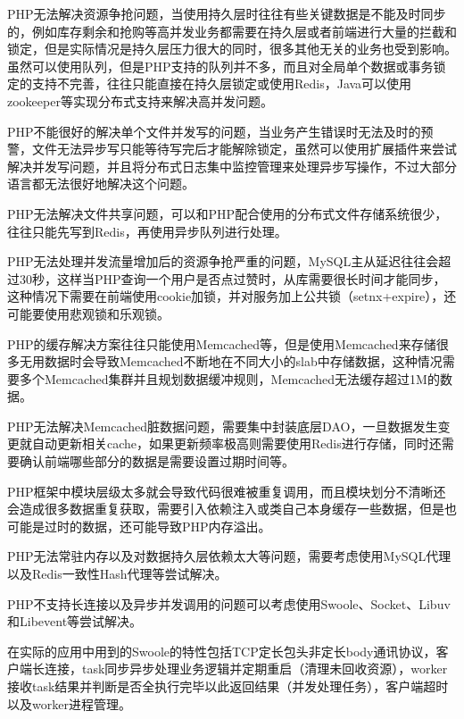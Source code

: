 PHP无法解决资源争抢问题，当使用持久层时往往有些关键数据是不能及时同步的，例如库存剩余和抢购等高并发业务都需要在持久层或者前端进行大量的拦截和锁定，但是实际情况是持久层压力很大的同时，很多其他无关的业务也受到影响。虽然可以使用队列，但是PHP支持的队列并不多，而且对全局单个数据或事务锁定的支持不完善，往往只能直接在持久层锁定或使用Redis，Java可以使用zookeeper等实现分布式支持来解决高并发问题。

PHP不能很好的解决单个文件并发写的问题​​，当业务产生错误时无法及时的预警，文件无法异步写只能等待写完后才能解除锁定，虽然可以使用扩展插件来尝试解决并发写问题，并且将分布式日志集中监控管理来处理异步写操作，不过大部分语言都无法很好地解决这个问题。

PHP无法解决文件共享问题，可以和PHP配合使用的分布式文件存储系统很少，往往只能先写到Redis，再使用异步队列进行处理。

PHP无法处理并发流量增加后的资源争抢严重的问题，MySQL主从延迟往往会超过30秒，这样当PHP查询一个用户是否点过赞时，从库需要很长时间才能同步，这种情况下需要在前端使用cookie加锁，并对服务加上公共锁（setnx+expire），还可能要使用悲观锁和乐观锁。

PHP的缓存解决方案往往只能使用Memcached等，但是使用Memcached来存储很多无用数据时会导致Memcached不断地在不同大小的slab中存储数据，这种情况需要多个Memcached集群并且规划数据缓冲规则，Memcached无法缓存超过1M的数据。

PHP无法解决Memcached脏数据问题，需要集中封装底层DAO，一旦数据发生变更就自动更新相关cache，如果更新频率极高则需要使用Redis进行存储，同时还需要​确认前端哪些部分的数据是需要设置过期时间等。


PHP框架中模块层级太多就会导致代码很难被重复调用，而且模块划分不清晰还会造成很多数据重复获取，需要引入依赖注入或类自己本身缓存一些数据，但是也可能是过时的数据，还可能导致PHP内存溢出。

PHP无法常驻内存以及对数据持久层依赖太大等问题，需要考虑使用MySQL代理以及Redis一致性Hash代理等尝试解决。

PHP不支持长连接以及异步并发调用的问题可以考虑使用Swoole、Socket、Libuv和Libevent等尝试解决。

在实际的应用中用到的Swoole的特性包括TCP定长包头非定长body通讯协议，客户端长连接，task同步异步处理业务逻辑并定期重启（清理未回收资源），worker接收task结果并判断是否全执行完毕以此返回结果（并发处理任务），客户端超时以及worker进程管理。​














